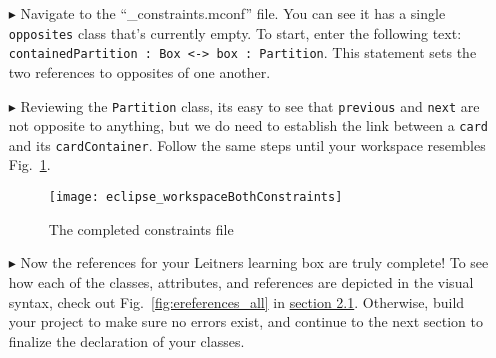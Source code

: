 \begin{itemize}
\item[$\blacktriangleright$] Navigate to the ``\_constraints.mconf'' file. You can see it has a single \texttt{opposites} class that's currently empty. To
start, enter the following text: \texttt{containedPartition : Box <-> box : Partition}. This statement sets the two references to opposites of one another. 



\item[$\blacktriangleright$] Reviewing the \texttt{Partition} class, its easy to see that \texttt{previous} and \texttt{next} are not opposite to anything, but
we do need to establish the link between a \texttt{card} and its \texttt{cardContainer}. Follow the same steps until your workspace resembles
Fig.~\ref{fig:bothConstraints}.

\begin{figure}[htbp]
	\centering
  \texttt{[image: eclipse\_workspaceBothConstraints]}
	\caption{The completed constraints file}
	\label{fig:bothConstraints}
\end{figure} 

\item[$\blacktriangleright$] Now the references for your Leitners learning box are truly complete! To see how each of the classes, attributes, and references
are depicted in the visual syntax, check out Fig.~\ref{fig:ereferences_all} in \hyperlink{sec:static vis}{section 2.1}. Otherwise, build your project to
make sure no errors exist, and continue to the next section to finalize the declaration of your classes.


\end{itemize}
